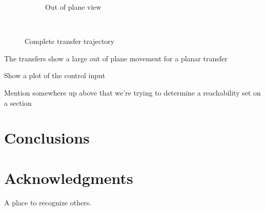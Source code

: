 \documentclass[]{aiaa-tc}%
\begin{document}
\begin{figure}[htbp]
\begin{subfigure}[htbp]{0.5\textwidth}
        \caption{Out of plane view} \label{fig:trajectory_3d} 
    \end{subfigure}~ %
    \caption{Complete transfer trajectory}
    \label{fig:trajectory} 
\end{figure}

The transfers show a large out of plane movement for a planar transfer

Show a plot of the control input

Mention somewhere up above that we're trying to determine a reachability set on a \Poincare section

\section{Conclusions}\label{sec:conclusions}


\section*{Acknowledgments}\label{sec:aknowledgments}

A place to recognize others.



\end{document}
